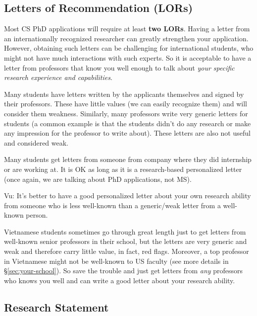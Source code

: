 \documentclass[11pt]{article}
\begin{document}
\subsection{Letters of Recommendation (LORs)}

Most CS PhD applications will require at least \textbf{two LORs}. Having a letter from an internationally recognized researcher can greatly strengthen your application. However, obtaining such letters
can be challenging for international students, who might not have much interactions with such experts. So it is acceptable to have a letter from professors that know you well enough to talk about \emph{your specific research experience and capabilities}.


Many students have letters written by the applicants themselves and signed by their professors. These have little
values (we can easily recognize them) and will consider them weakness.
Similarly, many professors write very generic letters for students (a common example is that the students didn't do any
research or make any impression for the professor to write about). These
letters are also not useful and considered weak.

Many students get letters from someone from company where they did internship or are
working at. It is OK as long as it is a research-based personalized
letter (once again, we are talking about PhD applications, not MS).


\begin{tcolorbox}[left=1pt,right=1pt,top=1pt,bottom=1pt]
Vu: It's better to have a good personalized
letter about your own research ability from someone who is less
well-known than a generic/weak letter from a well-known person.

Vietnamese students sometimes go through great length just to get letters from well-known senior professors in their school, but the letters are very generic and weak and therefore carry little value, in fact, red flags. Moreover, a top professor in Vietnamese might not be well-known to US faculty (see more details in \S\ref{sec:your-school}). So save the trouble and just get letters from \emph{any} professors who knows you well and can write a good letter about your research ability.
\end{tcolorbox}

\subsection{Research Statement}\label{sec:research-statement}
\end{document}

